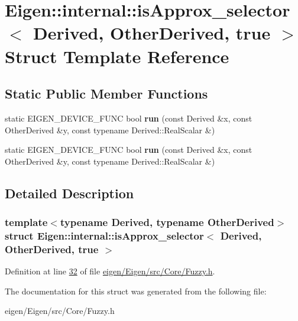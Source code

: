 \hypertarget{struct_eigen_1_1internal_1_1is_approx__selector_3_01_derived_00_01_other_derived_00_01true_01_4}{}\section{Eigen\+:\+:internal\+:\+:is\+Approx\+\_\+selector$<$ Derived, Other\+Derived, true $>$ Struct Template Reference}
\label{struct_eigen_1_1internal_1_1is_approx__selector_3_01_derived_00_01_other_derived_00_01true_01_4}
\subsection*{Static Public Member Functions}
\begin{DoxyCompactItemize}
\item 
\mbox{\label{struct_eigen_1_1internal_1_1is_approx__selector_3_01_derived_00_01_other_derived_00_01true_01_4_ad84f8989be5b6aef5fd1c859cea69050}} 
static E\+I\+G\+E\+N\+\_\+\+D\+E\+V\+I\+C\+E\+\_\+\+F\+U\+NC bool {\bfseries run} (const Derived \&x, const Other\+Derived \&y, const typename Derived\+::\+Real\+Scalar \&)
\item 
\mbox{\label{struct_eigen_1_1internal_1_1is_approx__selector_3_01_derived_00_01_other_derived_00_01true_01_4_ad84f8989be5b6aef5fd1c859cea69050}} 
static E\+I\+G\+E\+N\+\_\+\+D\+E\+V\+I\+C\+E\+\_\+\+F\+U\+NC bool {\bfseries run} (const Derived \&x, const Other\+Derived \&y, const typename Derived\+::\+Real\+Scalar \&)
\end{DoxyCompactItemize}


\subsection{Detailed Description}
\subsubsection*{template$<$typename Derived, typename Other\+Derived$>$\newline
struct Eigen\+::internal\+::is\+Approx\+\_\+selector$<$ Derived, Other\+Derived, true $>$}



Definition at line \hyperlink{eigen_2_eigen_2src_2_core_2_fuzzy_8h_source_l00032}{32} of file \hyperlink{eigen_2_eigen_2src_2_core_2_fuzzy_8h_source}{eigen/\+Eigen/src/\+Core/\+Fuzzy.\+h}.



The documentation for this struct was generated from the following file\+:\begin{DoxyCompactItemize}
\item 
eigen/\+Eigen/src/\+Core/\+Fuzzy.\+h\end{DoxyCompactItemize}
